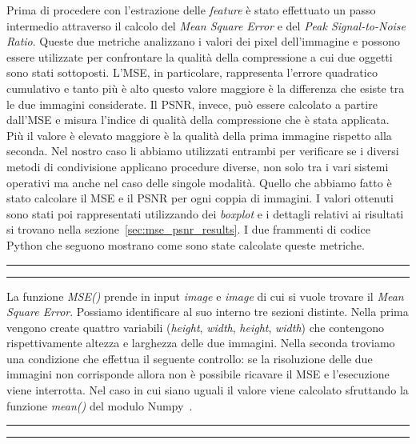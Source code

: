 Prima di procedere con l'estrazione delle \textit{feature} è stato effettuato un passo intermedio attraverso il calcolo del \textit{Mean Square Error} e del \textit{Peak Signal-to-Noise Ratio}. Queste due metriche analizzano i valori dei pixel dell'immagine e possono essere utilizzate per confrontare la qualità della compressione a cui due oggetti sono stati sottoposti. L'MSE, in particolare, rappresenta l'errore quadratico cumulativo e tanto più è alto questo valore maggiore è la differenza che esiste tra le due immagini considerate. Il PSNR, invece, può essere calcolato a partire dall'MSE e misura l'indice di qualità della compressione che è stata applicata. Più il valore è elevato maggiore è la qualità della prima immagine rispetto alla seconda. Nel nostro caso li abbiamo utilizzati entrambi per verificare se i diversi metodi di condivisione applicano procedure diverse, non solo tra i vari sistemi operativi ma anche nel caso delle singole modalità. Quello che abbiamo fatto è stato calcolare il MSE e il PSNR per ogni coppia di immagini. I valori ottenuti sono stati poi rappresentati utilizzando dei \textit{boxplot} e i dettagli relativi ai risultati si trovano nella sezione~\ref{sec:mse_psnr_results}. I due frammenti di codice Python che seguono mostrano come sono state calcolate queste metriche.

\begin{center}
\rule{9cm}{0.5pt}
\end{center}

\begin{center}
\rule{9cm}{0.5pt}
\end{center}
La funzione \textit{MSE()} prende in input \textit{image} e \textit{image} di cui si vuole trovare il \textit{Mean Square Error}. Possiamo identificare al suo interno tre sezioni distinte. Nella prima vengono create quattro variabili (\textit{height}, \textit{width}, \textit{height}, \textit{width}) che contengono rispettivamente altezza e larghezza delle due immagini. Nella seconda troviamo una condizione che effettua il seguente controllo: se la risoluzione delle due immagini non corrisponde allora non è possibile ricavare il MSE e l'esecuzione viene interrotta. Nel caso in cui siano uguali il valore viene calcolato sfruttando la funzione \textit{mean()} del modulo Numpy~\cite{numpy}.\newpage

\begin{center}
\rule{9cm}{0.5pt}
\end{center}

\begin{center}
\rule{9cm}{0.5pt}
\end{center}

